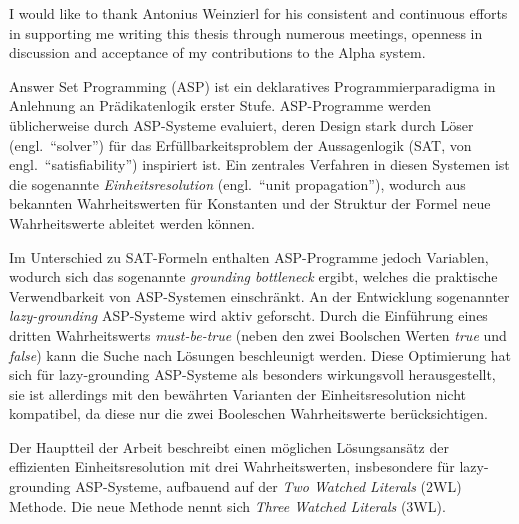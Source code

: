 \documentclass[final]{vutinfth} %
\newcommand{\mbt}{must-be-true\xspace}
\begin{document}
\frontmatter %

\addstatementpage


\begin{acknowledgements*}
I would like to thank Antonius Weinzierl for his consistent and continuous efforts in supporting me writing this thesis through numerous meetings, openness in discussion and acceptance of my contributions to the Alpha system.
\end{acknowledgements*}


\begin{kurzfassung*}
Answer Set Programming (ASP) ist ein deklaratives Programmierparadigma in Anlehnung an Prädikatenlogik erster Stufe. ASP-Programme werden üblicherweise durch ASP-Systeme evaluiert, deren Design stark durch Löser (engl.~\enquote{solver}) für das Erfüllbarkeitsproblem der Aussagenlogik (SAT, von engl.~\enquote{satisfiability}) inspiriert ist. Ein zentrales Verfahren in diesen Systemen ist die sogenannte \emph{Einheitsresolution} (engl.~\enquote{unit propagation}), wodurch aus bekannten Wahrheitswerten für Konstanten und der Struktur der Formel neue Wahrheitswerte ableitet werden können.

Im Unterschied zu SAT-Formeln enthalten ASP-Programme jedoch Variablen, wodurch sich das sogenannte \emph{grounding bottleneck} ergibt, welches die praktische Verwendbarkeit von ASP-Systemen einschränkt. An der Entwicklung sogenannter \emph{lazy-grounding} ASP-Systeme wird aktiv geforscht. Durch die Einführung eines dritten Wahrheitswerts \emph{\mbt} (neben den zwei Boolschen Werten \emph{true} und \emph{false}) kann die Suche nach Lösungen beschleunigt werden. Diese Optimierung hat sich für lazy-grounding ASP-Systeme als besonders wirkungsvoll herausgestellt, sie ist allerdings mit den bewährten Varianten der Einheitsresolution nicht kompatibel, da diese nur die zwei Booleschen Wahrheitswerte berücksichtigen.

Der Hauptteil der Arbeit beschreibt einen möglichen Lösungsansätz der effizienten Einheitsresolution mit drei Wahrheitswerten, insbesondere für lazy-grounding ASP-Systeme, aufbauend auf der \emph{Two Watched Literals} (2WL) Methode. Die neue Methode nennt sich \emph{Three Watched Literals} (3WL).


\end{kurzfassung*}
\end{document}
